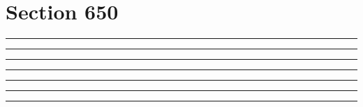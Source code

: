 \documentclass[11pt,a4paper]{article}
\begin{document}
\section{Section 650}
\begin{swarmwrap}%
  \begin{minipage}[t]{4cm}
    \centering
    \textcolor{red!20}{\rule{\linewidth}{4cm}}
  \end{minipage}%
\end{swarmwrap}%
\swarmwrapnext\lipsum[1]\lipsum[2]\lipsum[3]
\begin{swarmwrap}%
  \begin{minipage}[t]{5cm}
    \centering
    \textcolor{red!20}{\rule{\linewidth}{5cm}}
  \end{minipage}%
\end{swarmwrap}%
\swarmwrapnext\lipsum[1]\lipsum[2]\lipsum[3]\lipsum[4]
\begin{swarmwrap}%
  \begin{minipage}[t]{2cm}
    \centering
    \textcolor{red!20}{\rule{\linewidth}{6cm}}
  \end{minipage}%
\end{swarmwrap}%
\swarmwrapnext\lipsum[1]\lipsum[2]\lipsum[3]\lipsum[4]\lipsum[5]
\begin{swarmwrap}%
  \begin{minipage}[t]{3cm}
    \centering
    \textcolor{red!20}{\rule{\linewidth}{7cm}}
  \end{minipage}%
\end{swarmwrap}%
\swarmwrapnext\lipsum[1]\lipsum[2]\lipsum[3]\lipsum[4]\lipsum[5]\lipsum[6]
\begin{swarmwrap}%
  \begin{minipage}[t]{4cm}
    \centering
    \textcolor{red!20}{\rule{\linewidth}{8cm}}
  \end{minipage}%
\end{swarmwrap}%
\swarmwrapnext\lipsum[1]
\begin{swarmwrap}%
  \begin{minipage}[t]{5cm}
    \centering
    \textcolor{red!20}{\rule{\linewidth}{9cm}}
  \end{minipage}%
\end{swarmwrap}%
\swarmwrapnext\lipsum[1]\lipsum[2]
\begin{swarmwrap}%
  \begin{minipage}[t]{2cm}
    \centering
    \textcolor{red!20}{\rule{\linewidth}{10cm}}
  \end{minipage}%
\end{swarmwrap}%
\end{document}
